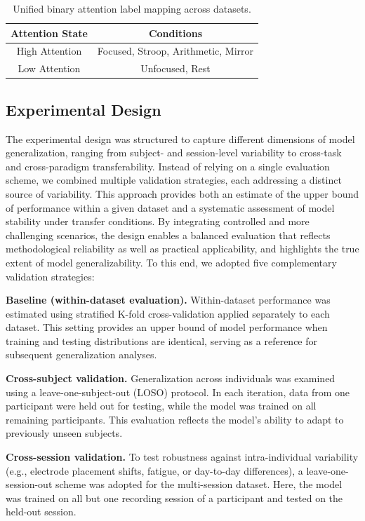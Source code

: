 \documentclass[utf8]{FrontiersinHarvard} %
\begin{document}
\begin{table}[h!]
\centering
\begin{tabular}{|c|c|}
\hline
\textbf{Attention State} & \textbf{Conditions} \\
\hline
High Attention & Focused, Stroop, Arithmetic, Mirror \\
Low Attention  & Unfocused, Rest \\
\hline
\end{tabular}
\caption{Unified binary attention label mapping across datasets.}
\label{tab:label_mapping}
\end{table}



\subsection{Experimental Design}
The experimental design was structured to capture different dimensions of model generalization, ranging from subject- and session-level variability to cross-task and cross-paradigm transferability. Instead of relying on a single evaluation scheme, we combined multiple validation strategies, each addressing a distinct source of variability. This approach provides both an estimate of the upper bound of performance within a given dataset and a systematic assessment of model stability under transfer conditions. By integrating controlled and more challenging scenarios, the design enables a balanced evaluation that reflects methodological reliability as well as practical applicability, and highlights the true extent of model generalizability. To this end, we adopted five complementary validation strategies:  

\textbf{Baseline (within-dataset evaluation).}  
Within-dataset performance was estimated using stratified K-fold cross-validation applied separately to each dataset. This setting provides an upper bound of model performance when training and testing distributions are identical, serving as a reference for subsequent generalization analyses.  

\textbf{Cross-subject validation.}  
Generalization across individuals was examined using a leave-one-subject-out (LOSO) protocol. In each iteration, data from one participant were held out for testing, while the model was trained on all remaining participants. This evaluation reflects the model’s ability to adapt to previously unseen subjects.  

\textbf{Cross-session validation.}  
To test robustness against intra-individual variability (e.g., electrode placement shifts, fatigue, or day-to-day differences), a leave-one-session-out scheme was adopted for the multi-session dataset. Here, the model was trained on all but one recording session of a participant and tested on the held-out session.  
\end{document}
